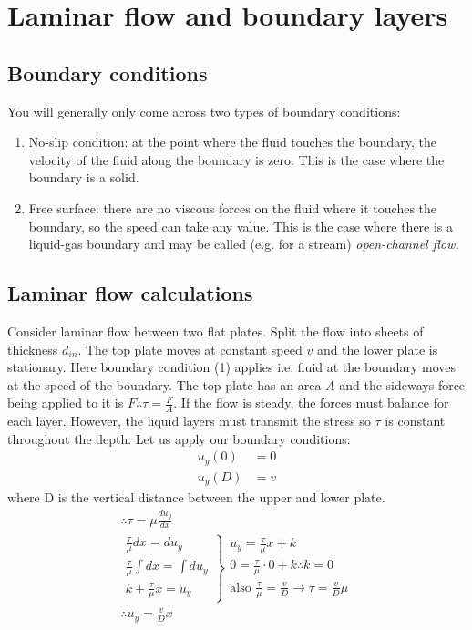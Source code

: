 \documentclass[class=report, crop=false, 12pt,a4paper]{standalone}
\begin{document}
\section{Laminar flow and boundary layers}
\subsection{Boundary conditions}
You will generally only come across two types of boundary conditions:
\begin{enumerate}[noitemsep]
  \item No-slip condition: at the point where the fluid touches the boundary, the velocity of the fluid along the boundary is zero. This is the case where the boundary is a solid.
  \item Free surface: there are no viscous forces on the fluid where it touches the boundary, so the speed can take any value. This is the case where there is a liquid-gas boundary and may be called (e.g. for a stream) \emph{open-channel flow.}
\end{enumerate}
\subsection{Laminar flow calculations}
Consider laminar flow between two flat plates. Split the flow into sheets of thickness \(d_{in}\). The top plate moves at constant speed \(v\) and the lower plate is stationary. Here boundary condition (1) applies i.e. fluid at the boundary moves at the speed of the boundary. The top plate has an area \(A\) and the sideways force being applied to it is \(F \therefore \tau = \frac{F}{A} \). If the flow is steady, the forces must balance for each layer. However, the liquid layers must transmit the stress so \(\tau\) is constant throughout the depth. Let us apply our boundary conditions:
\begin{align}
  u_y(0) &= 0 \\ 
  u_y(D) &= v
\end{align}
where D is the vertical distance between the upper and lower plate.
\begin{gather} 
  \therefore \tau = \mu \frac{du_y}{dx} \\
  \left.
    \begin{array}{r}
      \frac{\tau}{\mu} dx = du_y \\
      \frac{\tau}{\mu}\int dx = \int du_y \\
      k + \frac{\tau}{\mu}x = u_y
    \end{array}
  \right\}
  \begin{array}{l}
    u_y = \frac{\tau}{\mu}x + k \\
    0 = \frac{\tau}{\mu}\cdot 0 +k \therefore k = 0 \\
    \textrm{also } \frac{\tau}{\mu} = \frac{v}{D} \rightarrow \tau = \frac{v}{D}\mu
  \end{array}\\
  \therefore u_y = \frac{v}{D}x
\end{gather}
\end{document}
